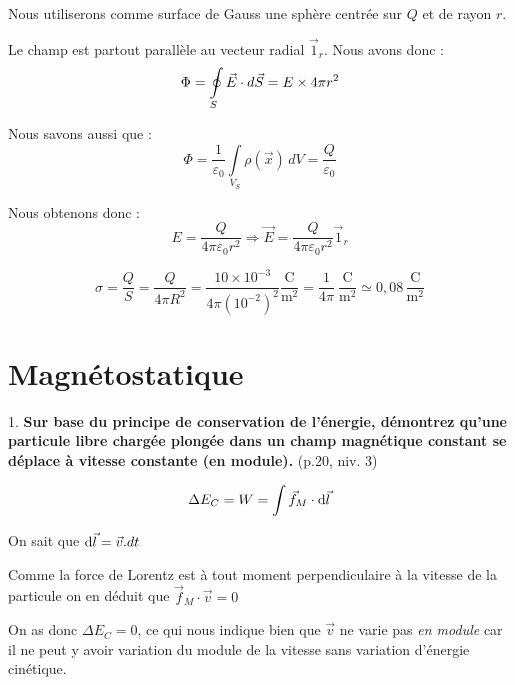 \documentclass	[11pt, a4paper, openany]{book}
\begin{document}
\vspace{0,5cm}

	
	Nous utiliserons comme surface de Gauss une sphère centrée sur $Q$ et de rayon $r$.
	
	Le champ est partout parallèle au vecteur radial $\vec 1_r$. Nous avons donc : $$ \Phi = \oint  \limits_S \E \cdot d \vec S = E \times 4\pi r^2 $$
	
	Nous savons aussi que : $$ \Phi = \dfrac{1}{\varepsilon_0} \int \limits_{V_S} \rho (\vec x) \, dV = \dfrac{Q}{\varepsilon_0} $$
	
	Nous obtenons donc : $$ E = \dfrac{Q}{4\pi \varepsilon_0 r^2} \Rightarrow \vec E = \dfrac{Q}{4\pi \varepsilon_0 r^2} \vec 1_r $$

\vspace{0,5cm}

	
	$$ \sigma = \dfrac{Q}{S} = \dfrac{Q}{4\pi R^2} = \dfrac{10\times 10^{-3}}{4\pi (10^{-2})^2} \dfrac{\mathrm{C}}{\mathrm{m}^2} = \dfrac{1}{4\pi}\ \dfrac{\mathrm{C}}{\mathrm{m}^2} \simeq 0,08\,\dfrac{\mathrm{C}}{\mathrm{m}^2}$$

\vspace{0,5cm}
		
		
\newpage
\renewcommand{\quest}[4]{#1. \textbf{#4} (p.#2, niv. #3)}
\section{Magnétostatique}

\quest{1}{20}{3}{Sur base du principe de conservation de l’énergie, démontrez qu’une particule libre chargée plongée dans un champ magnétique constant se déplace à vitesse constante (en module).}

$$\Delta E_C = W = \int \vec f_M \cdot {\rm d}\vec l$$

On sait que ${\rm d}\vec l = \vec v . dt$

Comme la force de Lorentz est à tout moment perpendiculaire à la vitesse de la particule on en déduit que $\vec f_M \cdot \vec v = 0$

On as donc $\Delta E_C = 0$, ce qui nous indique bien que $\vec v$ ne varie pas \emph{en module} car il ne peut y avoir variation du module de la vitesse sans variation d'énergie cinétique.
\end{document}
